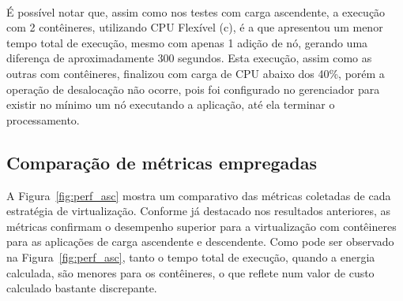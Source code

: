 \documentclass[twoside,english,brazilian]{UNISINOSartigo}
\begin{document}
\begin{figure}[ht!]
\vspace{-0.4\baselineskip}
\\

\label{fig:trend_des}
\end{figure}

É possível notar que, assim como nos testes com carga ascendente, a execução com 2 contêineres, utilizando CPU Flexível (c), é a que apresentou um menor tempo total de execução, mesmo com apenas 1 adição de nó, gerando uma diferença de aproximadamente 300 segundos. Esta execução, assim como as outras com contêineres, finalizou com carga de CPU abaixo dos 40\%, porém a operação de desalocação não ocorre, pois foi configurado no gerenciador para existir no mínimo um nó executando a aplicação, até ela terminar o processamento.


\subsection{Comparação de métricas empregadas}
\label{comp_metricas}

A Figura~\ref{fig:perf_asc} mostra um comparativo das métricas coletadas de cada estratégia de virtualização. Conforme já destacado nos resultados anteriores, as métricas confirmam o desempenho superior para a virtualização com contêineres para as aplicações de carga ascendente e descendente. Como pode ser observado na Figura~\ref{fig:perf_asc}, tanto o tempo total de execução, quando a energia calculada, são menores para os contêineres, o que reflete num valor de custo calculado bastante discrepante. 
\end{document}
